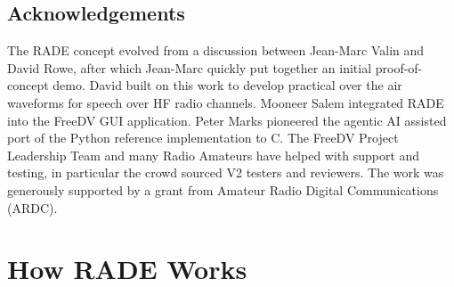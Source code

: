 \documentclass{article}
\begin{document}
\subsection{Acknowledgements}

The RADE concept evolved from a discussion between Jean-Marc Valin and David Rowe, after which Jean-Marc quickly put together an initial proof-of-concept demo.  David built on this work to develop practical over the air waveforms for speech over HF radio channels.  Mooneer Salem integrated RADE into the FreeDV GUI application.  Peter Marks pioneered the agentic AI assisted port of the Python reference implementation to C.  The FreeDV Project Leadership Team and many Radio Amateurs have helped with support and testing, in particular the crowd sourced V2 testers and reviewers.  The work was generously supported by a grant from Amateur Radio Digital Communications (ARDC).

\section{How RADE Works}
\end{document}
